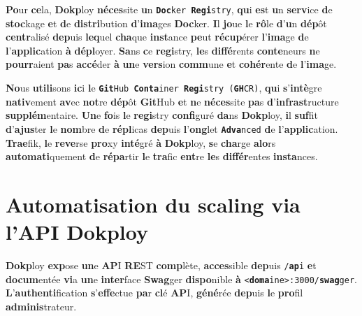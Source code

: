 \documentclass{rapportClass} %
\begin{document}
\textbf{Po}ur \textbf{ce}la, \textbf{Dokp}loy \textbf{néces}site \textbf{u}n \texttt{\textbf{Doc}ker \textbf{Regi}stry}, \textbf{qu}i \textbf{es}t \textbf{u}n \textbf{serv}ice \textbf{d}e \textbf{stoc}kage \textbf{e}t \textbf{d}e \textbf{distri}bution \textbf{d}'\textbf{ima}ges \textbf{Doc}ker. 
\textbf{I}l \textbf{jo}ue \textbf{l}e \textbf{rô}le \textbf{d}'\textbf{u}n \textbf{dép}ôt \textbf{centr}alisé \textbf{dep}uis \textbf{leq}uel \textbf{cha}que \textbf{inst}ance \textbf{pe}ut \textbf{récup}érer \textbf{l}'\textbf{ima}ge \textbf{d}e \textbf{l}'\textbf{applic}ation \textbf{à} \textbf{dépl}oyer. 
\textbf{Sa}ns \textbf{c}e \textbf{regi}stry, \textbf{le}s \textbf{diffé}rents \textbf{conte}neurs \textbf{n}e \textbf{pourr}aient \textbf{pa}s \textbf{accé}der \textbf{à} \textbf{un}e \textbf{vers}ion \textbf{comm}une \textbf{e}t \textbf{cohér}ente \textbf{d}e \textbf{l}'\textbf{ima}ge.

\textbf{No}us \textbf{utili}sons \textbf{ic}i \textbf{l}e \texttt{\textbf{Git}Hub \textbf{Conta}iner \textbf{Regi}stry (\textbf{GH}CR)}, \textbf{qu}i \textbf{s}'\textbf{intè}gre \textbf{nativ}ement \textbf{av}ec \textbf{not}re \textbf{dép}ôt \textbf{Git}Hub \textbf{e}t 
\textbf{n}e \textbf{néces}site \textbf{pa}s \textbf{d}'\textbf{infrast}ructure \textbf{supplém}entaire. \textbf{Un}e \textbf{fo}is \textbf{l}e \textbf{regi}stry \textbf{confi}guré \textbf{da}ns \textbf{Dokp}loy, \textbf{i}l \textbf{suf}fit \textbf{d}'\textbf{ajus}ter 
\textbf{l}e \textbf{nom}bre \textbf{d}e \textbf{répl}icas \textbf{dep}uis \textbf{l}'\textbf{ong}let \texttt{\textbf{Adva}nced} \textbf{d}e \textbf{l}'\textbf{applic}ation. \textbf{Trae}fik, \textbf{l}e \textbf{reve}rse \textbf{pro}xy \textbf{inté}gré \textbf{à} \textbf{Dokp}loy, 
\textbf{s}e \textbf{cha}rge \textbf{alo}rs \textbf{automati}quement \textbf{d}e \textbf{répa}rtir \textbf{l}e \textbf{tra}fic \textbf{ent}re \textbf{le}s \textbf{différ}entes \textbf{insta}nces.


\section{Automatisation du scaling via l'API Dokploy}
\label{sec:autoscaling}

\textbf{Dokp}loy \textbf{exp}ose \textbf{un}e \textbf{AP}I \textbf{RE}ST \textbf{comp}lète, \textbf{acces}sible \textbf{dep}uis
\texttt{/\textbf{ap}i} \textbf{e}t \textbf{docum}entée \textbf{vi}a \textbf{un}e \textbf{inter}face \textbf{Swag}ger \textbf{dispo}nible
\textbf{à} \texttt{<\textbf{doma}ine>:3000/\textbf{swag}ger}. \textbf{L}'\textbf{authenti}fication \textbf{s}'\textbf{effe}ctue
\textbf{pa}r \textbf{cl}é \textbf{AP}I, \textbf{géné}rée \textbf{dep}uis \textbf{l}e \textbf{pro}fil \textbf{adminis}trateur.
\end{document}
